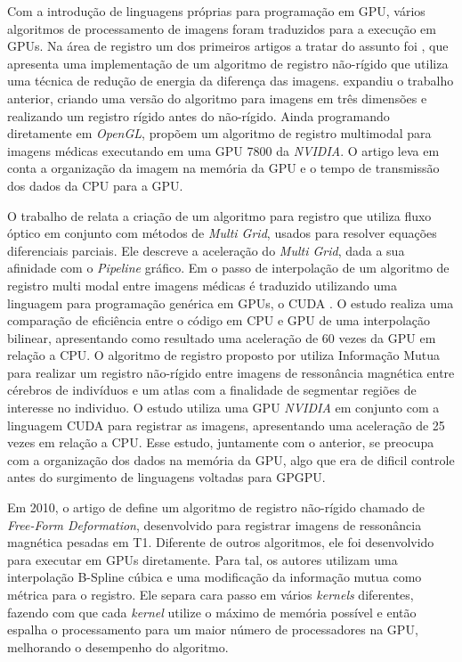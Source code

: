 	Com a introdução de linguagens próprias para programação em GPU, vários algoritmos de processamento de imagens foram
traduzidos para a execução em GPUs. Na área de registro um dos primeiros artigos a tratar do assunto foi 
\cite{strzodka2004image}, que apresenta uma implementação de um algoritmo de registro não-rígido que utiliza uma técnica
de redução de energia da diferença das imagens. \cite{kohn2006gpu} expandiu o trabalho anterior, criando uma versão do 
algoritmo para imagens em três dimensões e realizando um registro rígido antes do não-rígido. Ainda programando 
diretamente em \textit{OpenGL}, \cite{vetter2007non} propõem um algoritmo de registro multimodal para imagens médicas 
executando em uma GPU 7800 da \textit{NVIDIA}. O artigo leva em conta a organização da imagem na memória da GPU e o 
tempo de transmissão dos dados da CPU para a GPU.

	O trabalho de \cite{grossauer2008gpu} relata a criação de um algoritmo para registro que utiliza fluxo óptico em 
conjunto com métodos de \textit{Multi Grid}, usados para resolver equações diferenciais parciais. Ele descreve
a aceleração do \textit{Multi Grid}, dada a sua afinidade com o \textit{Pipeline} gráfico. Em \cite{bui2009performance}
o passo de interpolação de um algoritmo de registro multi modal entre imagens médicas é traduzido utilizando uma 
linguagem para programação genérica em GPUs, o CUDA \cite{nvidia2007compute}. O estudo realiza uma comparação de 
eficiência entre o código em CPU e GPU de uma interpolação bilinear, apresentando como resultado uma aceleração de 60 
vezes da GPU em relação a CPU. O algoritmo de registro proposto por \cite{han2009gpu} utiliza Informação Mutua para
realizar um registro não-rígido entre imagens de ressonância magnética entre cérebros de indivíduos e um atlas com a 
finalidade de segmentar regiões de interesse no individuo. O estudo utiliza uma GPU \textit{NVIDIA} em conjunto com a 
linguagem CUDA para registrar as imagens, apresentando uma aceleração de 25 vezes em relação a CPU. Esse estudo, 
juntamente com o anterior, se preocupa com a organização dos dados na memória da GPU, algo que era de dificil controle 
antes do surgimento de linguagens voltadas para GPGPU.

	Em 2010, o artigo de \cite{modat2010fast} define um algoritmo de registro não-rígido chamado de \textit{Free-Form 
Deformation}, desenvolvido para registrar imagens de ressonância magnética pesadas em T1. Diferente de outros algoritmos, 
ele foi desenvolvido para executar em GPUs diretamente. Para tal, os autores utilizam uma interpolação B-Spline cúbica e 
uma modificação da informação mutua como métrica para o registro. Ele separa cara passo em vários \textit{kernels} diferentes, fazendo
com que cada \textit{kernel} utilize o máximo de memória possível e então espalha o processamento para um maior número
de processadores na GPU, melhorando o desempenho do algoritmo. 

